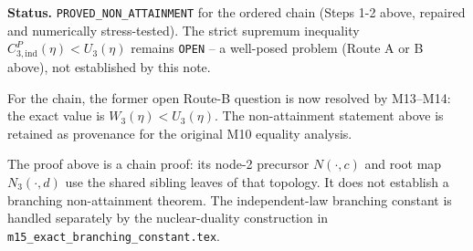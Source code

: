 \textbf{Status.} \texttt{PROVED\_NON\_ATTAINMENT} for the ordered chain
(Steps 1-2 above,
repaired and numerically stress-tested). The strict supremum inequality
$C_{3,\mathrm{ind}}^P(\eta)<U_3(\eta)$ remains \texttt{OPEN} -- a
well-posed problem (Route A or B above), not established by this note.

For the chain, the former open Route-B question is now resolved by M13--M14:
the exact value is $W_3(\eta)<U_3(\eta)$. The non-attainment statement above
is retained as provenance for the original M10 equality analysis.

The proof above is a chain proof: its node-2 precursor $N(\cdot,c)$ and
root map $N_3(\cdot,d)$ use the shared sibling leaves of that topology. It
does not establish a branching non-attainment theorem. The independent-law
branching constant is handled separately by the nuclear-duality construction
in \texttt{m15\_exact\_branching\_constant.tex}.
